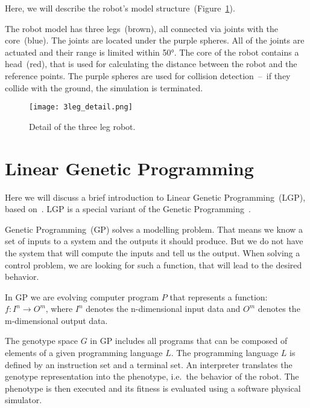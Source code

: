 \documentclass{ExcelAtFIT}
\begin{document}
Here, we will describe the robot's model structure~(Figure~\ref{fig:ThreeLegDetail}).

The robot model has three legs~(brown), all connected via joints with the core~(blue).
The joints are located under the purple spheres.
All of the joints are actuated and their range is limited within \ang{50}.
The core of the robot contains a head~(red), that is used for calculating the distance between the robot and the reference points.
The purple spheres are used for collision detection~--~if they collide with the ground, the simulation is terminated.

\begin{figure}[h]
	\centering
	{\texttt{[image: 3leg\_detail.png]}}
	\caption{
	Detail of the three leg robot.
	}
	\label{fig:ThreeLegDetail}
\end{figure}

\section{Linear Genetic Programming}
\label{sec:theory}
Here we will discuss a brief introduction to Linear Genetic Programming~(LGP), based on~\cite{Brameier2010}.
LGP is a special variant of the Genetic Programming~\cite{Koza1992}.

Genetic Programming~(GP) solves a modelling problem.
That means we know a set of inputs to a system and the outputs it should produce.
But we do not have the system that will compute the inputs and tell us the output.
When solving a control problem, we are looking for such a function, that will lead to the desired behavior.

In GP we are evolving computer program $P$ that represents a function: $f : I^n \to O^m$, where $I^n$ denotes the n-dimensional input data and $O^m$ denotes the m-dimensional output data.

The genotype space $G$ in GP includes all programs that can be composed of elements of a given programming language $L$.
The programming language $L$ is defined by an instruction set and a terminal set.
An interpreter translates the genotype representation into the phenotype, i.e.\ the behavior of the robot.
The phenotype is then executed and its fitness is evaluated using a software physical simulator.
\end{document}
